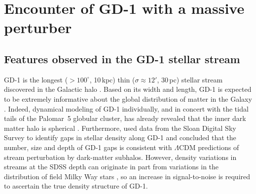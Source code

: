 \documentclass[12pt, modern]{aastex62}
\newcommand{\articlename}{\textsl{Letter}}
\newcommand{\sectionname}{Section}
\begin{document}
% 


\section{Encounter of GD-1 with a massive perturber}
\subsection{Features observed in the GD-1 stellar stream}
\label{sec:data}
GD-1 is the longest ($>100^\circ$, 10\,kpc) thin ($\sigma\approx12'$, 30\,pc) stellar stream discovered in the Galactic halo \citep{gd2006}.
Based on its width and length, GD-1 is expected to be extremely informative about the global distribution of matter in the Galaxy \citep{lux2013, bh2018}.
Indeed, dynamical modeling of GD-1 individually, and in concert with the tidal tails of the Palomar~5 globular cluster, has already revealed that the inner dark matter halo is spherical \citep{koposov2010, bowden2015, bovy2016}.
Furthermore, \citet{cg2013} used data from the Sloan Digital Sky Survey \citep[SDSS,][]{york2000} to identify gaps in stellar density along GD-1 and concluded that the number, size and depth of GD-1 gaps is consistent with $\Lambda$CDM predictions of stream perturbation by dark-matter subhalos.
However, density variations in streams at the SDSS depth can originate in part from variations in the distribution of field Milky Way stars \citep{ibata2016}, so an increase in signal-to-noise is required to ascertain the true density structure of GD-1.
\end{document}

